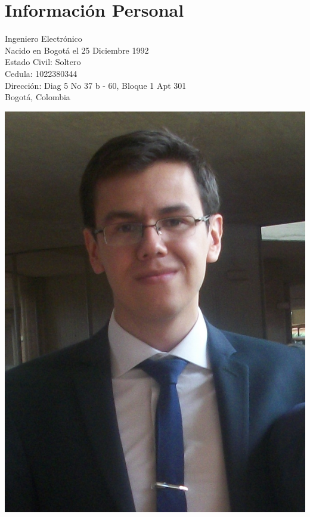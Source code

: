 \documentclass[]{deedy-resume-openfont}
\begin{document}
%
%



\vspace*{0.6cm}

\begin{minipage}[c]{.6\textwidth}
\section{Información Personal}
\vspace*{0.4cm}
\begin{flushleft}
	Ingeniero Electrónico\\
    Nacido en Bogotá el 25 Diciembre 1992\\
    Estado Civil: Soltero\\
    Cedula: 1022380344 \\
    Dirección: Diag 5 No 37 b - 60, Bloque 1 Apt 301\\
    Bogotá, Colombia
   
\end{flushleft}\normalsize
\end{minipage}
\hfill
\begin{minipage}[c]{.35\textwidth}
\begin{flushright}
\vspace*{0.4cm}
\includegraphics[width=80 pt]{100_9281.JPG}
\hspace*{0.6cm}
\end{flushright}

\end{minipage}
\vspace*{0.3cm}
\end{document}
